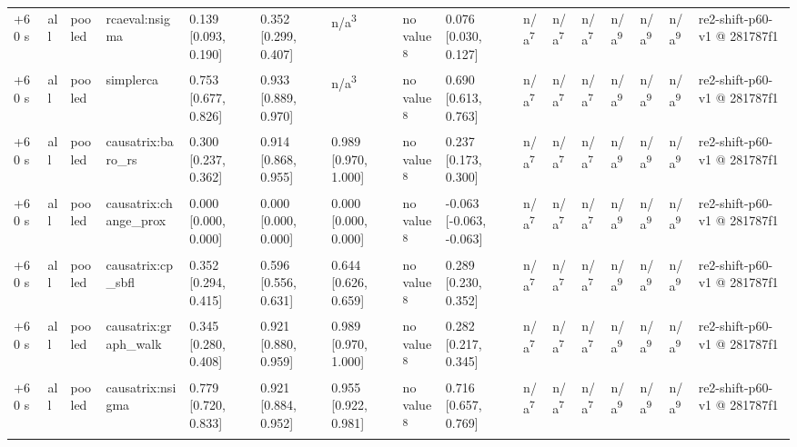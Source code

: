 \begin{table}[t]
\begin{tabular}{llllllllllllllll}
+60 s & all & pooled & rcaeval:nsigma & 0.139 [0.093, 0.190] & 0.352 [0.299, 0.407] & n/a\textsuperscript{3} & no value\textsuperscript{8} & 0.076 [0.030, 0.127] & n/a\textsuperscript{7} & n/a\textsuperscript{7} & n/a\textsuperscript{7} & n/a\textsuperscript{9} & n/a\textsuperscript{9} & n/a\textsuperscript{9} & re2-shift-p60-v1 @ 281787f1 \\
+60 s & all & pooled & simplerca & 0.753 [0.677, 0.826] & 0.933 [0.889, 0.970] & n/a\textsuperscript{3} & no value\textsuperscript{8} & 0.690 [0.613, 0.763] & n/a\textsuperscript{7} & n/a\textsuperscript{7} & n/a\textsuperscript{7} & n/a\textsuperscript{9} & n/a\textsuperscript{9} & n/a\textsuperscript{9} & re2-shift-p60-v1 @ 281787f1 \\
+60 s & all & pooled & causatrix:baro\_rs & 0.300 [0.237, 0.362] & 0.914 [0.868, 0.955] & 0.989 [0.970, 1.000] & no value\textsuperscript{8} & 0.237 [0.173, 0.300] & n/a\textsuperscript{7} & n/a\textsuperscript{7} & n/a\textsuperscript{7} & n/a\textsuperscript{9} & n/a\textsuperscript{9} & n/a\textsuperscript{9} & re2-shift-p60-v1 @ 281787f1 \\
+60 s & all & pooled & causatrix:change\_prox & 0.000 [0.000, 0.000] & 0.000 [0.000, 0.000] & 0.000 [0.000, 0.000] & no value\textsuperscript{8} & -0.063 [-0.063, -0.063] & n/a\textsuperscript{7} & n/a\textsuperscript{7} & n/a\textsuperscript{7} & n/a\textsuperscript{9} & n/a\textsuperscript{9} & n/a\textsuperscript{9} & re2-shift-p60-v1 @ 281787f1 \\
+60 s & all & pooled & causatrix:cp\_sbfl & 0.352 [0.294, 0.415] & 0.596 [0.556, 0.631] & 0.644 [0.626, 0.659] & no value\textsuperscript{8} & 0.289 [0.230, 0.352] & n/a\textsuperscript{7} & n/a\textsuperscript{7} & n/a\textsuperscript{7} & n/a\textsuperscript{9} & n/a\textsuperscript{9} & n/a\textsuperscript{9} & re2-shift-p60-v1 @ 281787f1 \\
+60 s & all & pooled & causatrix:graph\_walk & 0.345 [0.280, 0.408] & 0.921 [0.880, 0.959] & 0.989 [0.970, 1.000] & no value\textsuperscript{8} & 0.282 [0.217, 0.345] & n/a\textsuperscript{7} & n/a\textsuperscript{7} & n/a\textsuperscript{7} & n/a\textsuperscript{9} & n/a\textsuperscript{9} & n/a\textsuperscript{9} & re2-shift-p60-v1 @ 281787f1 \\
+60 s & all & pooled & causatrix:nsigma & 0.779 [0.720, 0.833] & 0.921 [0.884, 0.952] & 0.955 [0.922, 0.981] & no value\textsuperscript{8} & 0.716 [0.657, 0.769] & n/a\textsuperscript{7} & n/a\textsuperscript{7} & n/a\textsuperscript{7} & n/a\textsuperscript{9} & n/a\textsuperscript{9} & n/a\textsuperscript{9} & re2-shift-p60-v1 @ 281787f1 \\

\end{tabular}
\end{table}
